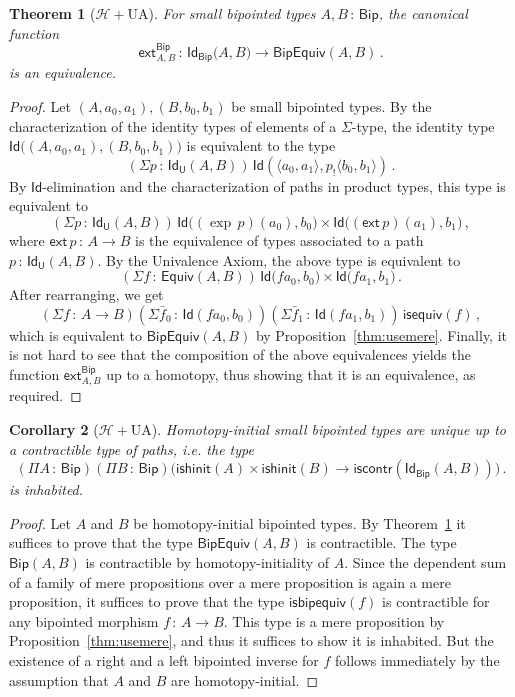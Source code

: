 \documentclass[10pt,a4paper,oneside,reqno]{amsart}
\numberwithin{equation}{section}
\theoremstyle{mythm}
\newtheorem{theorem}{Theorem}[subsection]
\newtheorem{corollary}[theorem]{Corollary}
\theoremstyle{mydef}
\theoremstyle{myrmk}
\newcommand{\co}{\,{:}\,}
\newcommand{\Hint}{\mathcal{H}}
\newcommand{\iscontr}{\mathsf{iscontr}}
\newcommand{\isequiv}{\mathsf{isequiv}}
\newcommand{\isbiphinit}{\mathsf{ishinit}}
\newcommand{\Eq}{\mathsf{Equiv}}
\newcommand{\ext}{\mathsf{ext}}
\newcommand{\Id}{\mathsf{Id}}
\newcommand{\U}{\mathsf{U}}
\newcommand{\Bip}{\mathsf{Bip}}
\newcommand{\BipHom}{\mathsf{Bip}}
\newcommand{\isbipequiv}{\mathsf{isbipequiv}}
\newcommand{\BipEquiv}{\mathsf{BipEquiv}}
\begin{document}
\begin{theorem}[$\Hint + \mathrm{UA}$] \label{thm:bipunivalence}
For small bipointed types $A, B \co \Bip$, the  canonical function
\[ 
\ext^{\Bip}_{A,B} \co \Id_{\Bip} \big(A,B\big) \to  \BipEquiv(A,B) \, .
\] 
is an equivalence.
\end{theorem} 

\begin{proof} 
Let $ (A,a_0,a_1), (B,b_0,b_1)$ be small bipointed types. By the characterization of the identity types
of  elements of a $\Sigma$-type, the 
identity type $\Id\big( (A,a_0,a_1),  (B,b_0,b_1)\big)$ is equivalent to  the type
\[
(\Sigma p \co \Id_\U(A,B))  \, \Id(\langle a_0,a_1 \rangle,  p_{!} \langle b_0,b_1\rangle)  \, .
\]
By $\Id$-elimination and the characterization of paths in product types, this type is equivalent to
\[ 
(\Sigma p \co \Id_\U(A,B)) \, \Id \big( (\exp \, p)(a_0),  b_0\big) \times \Id \big( (\ext \, p)(a_1) , b_1) \, ,
 \]
where $\ext \, p \co A \to B$ is the equivalence of types associated to a path $p \co \Id_\U(A,B)$.  By the Univalence Axiom,
the above type is equivalent to
\[ 
(\Sigma f \co \Eq(A,B)) \, \Id \big( f a_0 ,  b_0\big) \times \Id \big( f a_1 , b_1\big)  \, .
\]
After rearranging, we get
\[
(\Sigma f  \co A \to B)(\Sigma \bar{f}_0 \co \Id( fa_0, b_0)) (\Sigma \bar{f}_1 \co \Id( fa_1, b_1))  \, \isequiv(f) \, ,
\]
which is equivalent to $\BipEquiv(A,B)$ by Proposition~\ref{thm:usemere}. Finally, it is not hard to see that the composition of the above equivalences yields the  function $\ext^{\Bip}_{A,B}$ up to a homotopy, thus showing that it is an equivalence, as required.
\end{proof} 

\begin{corollary}[$\Hint + \mathrm{UA}$] \label{BoolHInitIso} 
Homotopy-initial small bipointed types are unique up to a contractible type of paths, i.e. the type
\[ 
(\Pi A \co \Bip) (\Pi B \co \Bip)
\big( \isbiphinit(A) \times \isbiphinit(B) \to \iscontr(\Id_\Bip(A,B)) \big) \, .
\] 
is inhabited.
\end{corollary}

\begin{proof} Let $A$ and $B$ be homotopy-initial bipointed types. 
By Theorem~\ref{thm:bipunivalence} it suffices to prove that the type $\BipEquiv(A,B)$ is contractible. The type 
$\BipHom( A, B)$ is contractible by homotopy-initiality of $A$. Since the dependent sum of a family of mere propositions over a mere proposition is again a mere proposition, it suffices to prove that the type $\isbipequiv(f)$ is contractible for any bipointed morphism $f \co A \to B$. This type is a mere proposition by 
Proposition~\ref{thm:usemere}, and thus it suffices to show it is inhabited. But the existence of a right and a left bipointed inverse for $f$ follows immediately
by the assumption that $A$ and $B$ are homotopy-initial.
\end{proof}
\end{document}
